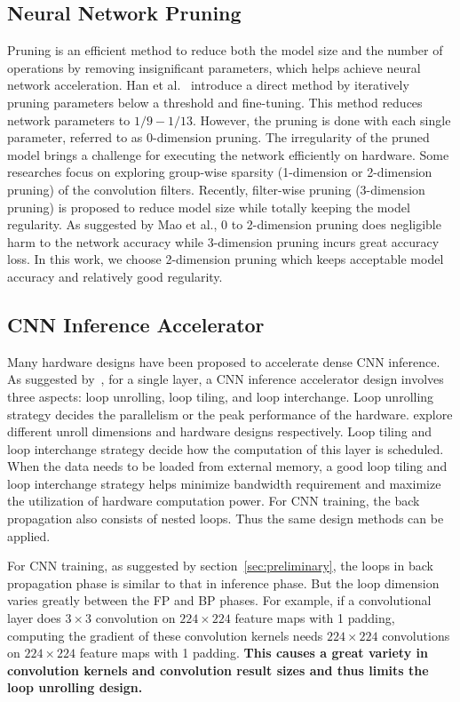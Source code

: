 \subsection{Neural Network Pruning}\label{sec:rw:prune}
Pruning is an efficient method to reduce both the model size and the number of operations by removing insignificant parameters, which helps achieve neural network acceleration. Han et al.~\cite{han2015learning} introduce a direct method by iteratively pruning parameters below a threshold and fine-tuning. This method reduces network parameters to $1/9-1/13$. However, the pruning is done with each single parameter, referred to as 0-dimension pruning. The irregularity of the pruned model brings a challenge for executing the network efficiently on hardware. Some researches focus on exploring group-wise sparsity (1-dimension or 2-dimension pruning)\cite{lebedev2016fast,zhou2016less,wen2016learning} of the convolution filters. Recently, filter-wise pruning (3-dimension pruning)\cite{molchanov2016pruning,li2016pruning} is proposed to reduce model size while totally keeping the model regularity. As suggested by Mao et al.\cite{mao2017exploring}, 0 to 2-dimension pruning does negligible harm to the network accuracy while 3-dimension pruning incurs great accuracy loss. In this work, we choose 2-dimension pruning which keeps acceptable model accuracy and relatively good regularity.

\subsection{CNN Inference Accelerator}\label{sec:rw:inference_acc}
Many hardware designs have been proposed to accelerate dense CNN inference. As suggested by~\cite{ma2017optimizing}, for a single layer, a CNN inference accelerator design involves three aspects: loop unrolling, loop tiling, and loop interchange. Loop unrolling strategy decides the parallelism or the peak performance of the hardware. \cite{zhang2015optimizing, du2015shidiannao, qiu2016going} explore different unroll dimensions and hardware designs respectively. Loop tiling and loop interchange strategy decide how the computation of this layer is scheduled. When the data needs to be loaded from external memory, a good loop tiling and loop interchange strategy helps minimize bandwidth requirement and maximize the utilization of hardware computation power. For CNN training, the back propagation also consists of nested loops. Thus the same design methods can be applied.

For CNN training, as suggested by section~\ref{sec:preliminary}, the loops in back propagation phase is similar to that in inference phase. But the loop dimension varies greatly between the FP and BP phases. For example, if a convolutional layer does $3\times 3$ convolution on $224\times 224$ feature maps with 1 padding, computing the gradient of these convolution kernels needs $224\times 224$ convolutions on $224\times 224$ feature maps with 1 padding. {\bf{This causes a great variety in convolution kernels and convolution result sizes and thus limits the loop unrolling design.}} 


